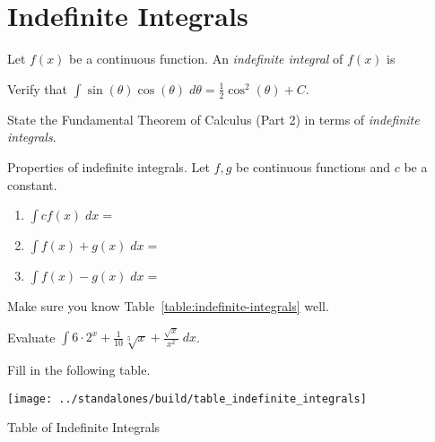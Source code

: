 \documentclass[../main.tex]{subfiles}
\begin{document}


\section{Indefinite Integrals}

Let \(f(x)\) be a {continuous} function. An \emph{indefinite integral} of \(f(x)\) is 
\vspace{3in}

\begin{example}
  Verify that \(\int \sin(\theta) \cos(\theta) \; d\theta = \frac{1}{2} \cos^{2}(\theta) + C\).
\end{example}
\vspace{2in}
\bigskip

\faComments{} State the Fundamental Theorem of Calculus (Part 2) in terms of \emph{indefinite integrals}. 
\vspace{2in}

\clearpage

\begin{mdframed}[style=simple]
  Properties of indefinite integrals. Let \(f,g\) be continuous functions and \(c\) be a constant.
  \begin{enumerate}[label=(\alph*)]
    \item  \(\int c f(x) \;dx = \)
    \item  \(\int f(x) + g(x) \;dx = \)
    \item  \(\int f(x) - g(x) \;dx = \)
  \end{enumerate}
\end{mdframed}
\faStar{} Make sure you know Table~\ref{table:indefinite-integrals} well.

\begin{example}
  Evaluate \(\int 6 \cdot 2^{x} + \frac{1}{10} \sqrt[5]{x} + \frac{\sqrt{x}}{x^{2}} \; dx\).
\end{example}

\clearpage

Fill in the following table.

\begin{table}[h!]  %
\centering
\texttt{[image: ../standalones/build/table\_indefinite\_integrals]}
\caption{Table of Indefinite Integrals}
\label{table:indefinite-integrals}
\end{table}

\clearpage
\end{document}
